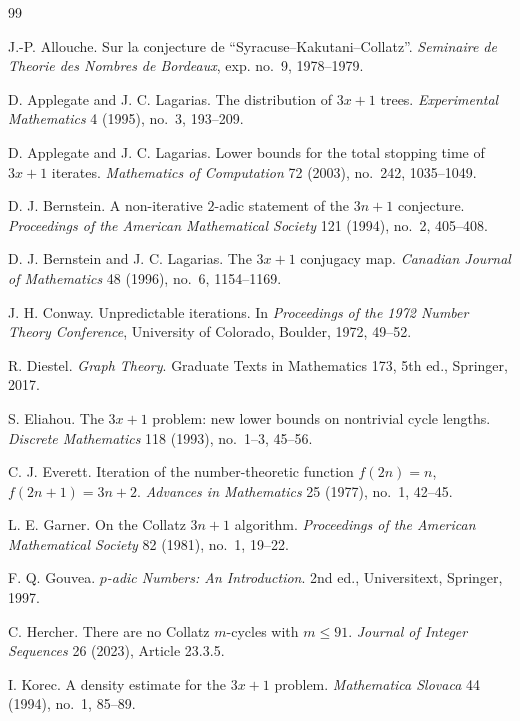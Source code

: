 \documentclass[11pt]{amsart}
\theoremstyle{definition}
\theoremstyle{remark}
\begin{document}
\begin{thebibliography}{99}

J.-P. Allouche.
Sur la conjecture de ``Syracuse--Kakutani--Collatz''.
\emph{Seminaire de Theorie des Nombres de Bordeaux}, exp. no.~9, 1978--1979.

D. Applegate and J. C. Lagarias.
The distribution of $3x+1$ trees.
\emph{Experimental Mathematics} 4 (1995), no.~3, 193--209.

D. Applegate and J. C. Lagarias.
Lower bounds for the total stopping time of $3x+1$ iterates.
\emph{Mathematics of Computation} 72 (2003), no.~242, 1035--1049.

D. J. Bernstein.
A non-iterative $2$-adic statement of the $3n+1$ conjecture.
\emph{Proceedings of the American Mathematical Society} 121 (1994), no.~2, 405--408.

D. J. Bernstein and J. C. Lagarias.
The $3x+1$ conjugacy map.
\emph{Canadian Journal of Mathematics} 48 (1996), no.~6, 1154--1169.

J. H. Conway.
Unpredictable iterations.
In \emph{Proceedings of the 1972 Number Theory Conference}, University of Colorado, Boulder, 1972, 49--52.

R. Diestel.
\emph{Graph Theory}.
Graduate Texts in Mathematics 173, 5th ed., Springer, 2017.

S. Eliahou.
The $3x+1$ problem: new lower bounds on nontrivial cycle lengths.
\emph{Discrete Mathematics} 118 (1993), no.~1--3, 45--56.

C. J. Everett.
Iteration of the number-theoretic function $f(2n)=n$, $f(2n+1)=3n+2$.
\emph{Advances in Mathematics} 25 (1977), no.~1, 42--45.

L. E. Garner.
On the Collatz $3n+1$ algorithm.
\emph{Proceedings of the American Mathematical Society} 82 (1981), no.~1, 19--22.

F. Q. Gouvea.
\emph{$p$-adic Numbers: An Introduction}.
2nd ed., Universitext, Springer, 1997.

C. Hercher.
There are no Collatz $m$-cycles with $m\le91$.
\emph{Journal of Integer Sequences} 26 (2023), Article 23.3.5.

I. Korec.
A density estimate for the $3x+1$ problem.
\emph{Mathematica Slovaca} 44 (1994), no.~1, 85--89.


\end{thebibliography}
\end{document}
